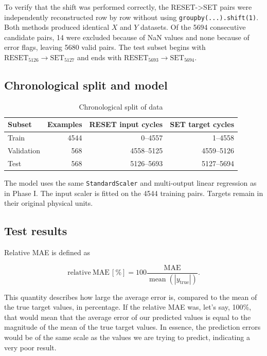 \documentclass[11pt,a4paper]{article}
\begin{document}
To verify that the shift was performed correctly, the RESET->SET pairs
were independently reconstructed row by row without using
\texttt{groupby(...).shift(1)}. Both methods produced identical $X$ and
$Y$ datasets. Of the 5694 consecutive candidate pairs, 14 were excluded
because of NaN values and none because of error flags, leaving 5680 valid
pairs. The test subset begins with
$\mathrm{RESET}_{5126}\rightarrow\mathrm{SET}_{5127}$ and ends with
$\mathrm{RESET}_{5693}\rightarrow\mathrm{SET}_{5694}$.

\subsection{Chronological split and model}

\begin{table}[H]
\centering
\caption{Chronological split of data}
\begin{tabular}{lrrr}
\toprule
Subset & Examples & RESET input cycles & SET target cycles \\
\midrule
Train & 4544 & 0--4557 & 1--4558 \\
Validation & 568 & 4558--5125 & 4559--5126 \\
Test & 568 & 5126--5693 & 5127--5694 \\
\bottomrule
\end{tabular}
\end{table}

The model uses the same \texttt{StandardScaler} and multi-output linear
regression as in Phase I. The input scaler is fitted on the 4544 training
pairs. Targets remain in their original physical units.

\subsection{Test results}

Relative MAE is defined as

\[
\mathrm{relative\ MAE}\,[\%]
=100\frac{\mathrm{MAE}}{\operatorname{mean}(|y_{\mathrm{true}}|)}.
\]

This quantity describes how large the average error is, compared to the mean of the true target values, in percentage. If the relative MAE was, let's say, 100\%, that would mean that the average error of our predicted values is equal to the magnitude of the mean of the true target values. In essence, the prediction errors would be of the same scale as the values we are trying to predict, indicating a very poor result.
\end{document}

